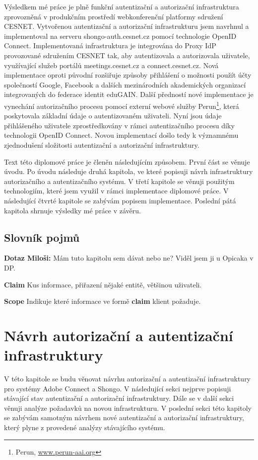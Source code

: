 \documentclass[
  printed, %
  twoside, %
  table,   %
  nolof,     %
  nolot,     %
]{fithesis3}
\begin{document}
Výsledkem mé práce je plně funkční autentizační a autorizační infrastruktura zprovozněná v produkčním prostředí webkonferenční platformy sdružení CESNET. Vytvořenou autentizační a autorizační infrastrukturu jsem navrhnul a implementoval na serveru shongo-auth.cesnet.cz pomocí technologie OpenID Connect. Implementovaná infrastruktura je integrována do Proxy IdP provozované sdružením CESNET tak, aby autentizovala a autorizovala uživatele, využívající služeb portálů meetings.cesnet.cz a connect.cesnet.cz. Nová implementace oproti původní rozšiřuje způsoby přihlášení o možnosti použít účty společností Google, Facebook a dalších mezinárodních akademických organizací integrovaných do federace identit eduGAIN. Další předností nové implementace je vynechání autorizačního procesu pomocí externí webové služby Perun\footnote{Perun, \url{www.perun-aai.org}}, která poskytovala základní údaje o autentizovaném uživateli. Nyní jsou údaje přihlášeného uživatele zprostředkovány v rámci autentizačního procesu díky technologii OpenID Connect. Novou implementací došlo tedy k významnému zjednodušení složitosti autentizační a autorizační infrastruktury. \par

Text této diplomové práce je členěn následujícím způsobem. První část se věnuje úvodu. Po úvodu následuje druhá kapitola, ve které popisuji návrh infrastruktury autorizačního a autentizačního systému. V třetí kapitole se věnuji použitým technologiím, které jsem využil v rámci implementace diplomové práce. V následující čtvrté kapitole se zabývám popisem implementace. Poslední pátá kapitola shrnuje výsledky mé práce v závěru. 

\section{Slovník pojmů}
\textbf{Dotaz Miloši:} Mám tuto kapitolu sem dávat nebo ne? Viděl jsem ji u Opicaka v DP. \\ 
\par
\textbf{Claim} Kus informace, přiřazení nějaké entitě, většinou uživateli. \\ \par 
\noindent
\textbf{Scope} Indikuje které informace ve formě \textbf{claim} klient požaduje.

\chapter{Návrh autorizační a autentizační infrastruktury}
V této kapitole se budu věnovat návrhu autorizační a autentizační infrastruktury pro systémy Adobe Connect a Shongo. V následující sekci nejprve popisuji stávající stav autentizační a autorizační infrastruktury. Dále se v další sekci věnuji analýze požadavků na novou infrastrukturu. V poslední sekci této kapitoly se zabývám samotným návrhem nové autentizační a autorizační infrastruktury, který plyne z provedené analýzy stávajícího systému.    
\end{document}
